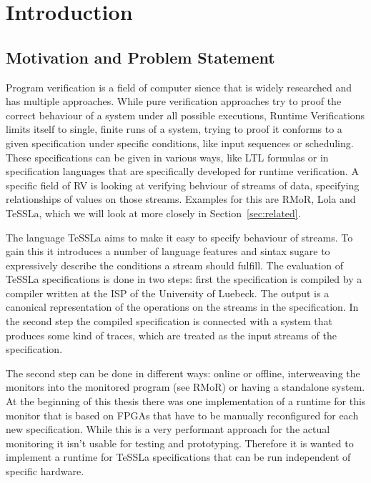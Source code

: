%
\chapter{Introduction}
\label{sec:intro}



\section{Motivation and Problem Statement}
\label{sec:intro:motivation}

Program verification is a field of computer sience that is widely researched and has multiple approaches.
While pure verification approaches try to proof the correct behaviour of a system under all possible executions,
Runtime Verifications limits itself to single, finite runs of a system, trying to proof it conforms to a given specification
under specific conditions, like input sequences or scheduling.
These specifications can be given in various ways, like LTL formulas or in specification languages that are specifically developed for
runtime verification.
A specific field of RV is looking at verifying behviour of streams of data, specifying relationships of values on those streams.
Examples for this are RMoR, Lola and TeSSLa, which we will look at more closely in Section~\ref{sec:related}.

The language TeSSLa aims to make it easy to specify behaviour of streams.
To gain this it introduces a number of language features and sintax sugare to expressively describe the conditions a stream should fulfill.
The evaluation of TeSSLa specifications is done in two steps: first the specification is compiled by a compiler written at the ISP of the University of Luebeck.
The output is a canonical representation of the operations on the streams in the specification.
In the second step the compiled specification is connected with a system that produces some kind of traces, which are treated as the input streams of the specification.

The second step can be done in different ways: online or offline, interweaving the monitors into the monitored program (see RMoR) or having a standalone system.
At the beginning of this thesis there was one implementation of a runtime for this monitor that is based on FPGAs that have to be manually reconfigured for each new specification.
While this is a very performant approach for the actual monitoring it isn't usable for testing and prototyping.
Therefore it is wanted to implement a runtime for TeSSLa specifications that can be run independent of specific hardware.


